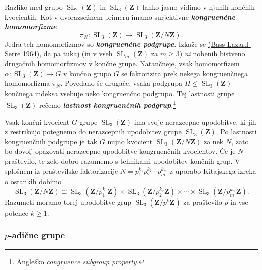 \documentclass[11pt]{book}
\def\ZZ{\mathbf{Z}}
\DeclareMathOperator\SL{SL}
\def\definicija{\color{rdeca}\bf\em}
\theoremstyle{definition}
\theoremstyle{zgled}
\theoremstyle{odprtproblem}
\theoremstyle{domacanaloga}
\theoremstyle{izrek}
\begin{document}
Razliko med grupo $\SL_2(\ZZ)$ in $\SL_3(\ZZ)$ lahko jasno vidimo v njunih končnih kvocientih. Kot v dvorazsežnem primeru imamo surjektivne {\definicija kongruenčne homomorfizme}
\[
    \textstyle \pi_N \colon \SL_3(\ZZ) \to \SL_3(\ZZ/N\ZZ).
\]
Jedra teh homomorfizmov so {\definicija kongruenčne podgrupe}. Izkaže se \href{https://projecteuclid.org/journals/bulletin-of-the-american-mathematical-society-new-series/volume-70/issue-3/Sous-groupes-dindice-fini-dans-SLleft-nZ-right/bams/1183526018.full}{(Bass-Lazard-Serre 1964)}, da pa tukaj (in v vseh $\SL_m(\ZZ)$ za $m \geq 3$) \emph{ni} nobenih bistveno drugačnih homomorfizmov v končne grupe. Natančneje, vsak homomorfizem $\alpha \colon \SL_3(\ZZ) \to G$ v končno grupo $G$ se faktorizira prek nekega kongruenčnega homomorfizma $\pi_N$. Povedano še drugače, vsaka podgrupa $H \leq \SL_3(\ZZ)$ končnega indeksa vsebuje neko kongruenčno podgrupo. Tej lastnosti grupe $\SL_3(\ZZ)$ rečemo {\definicija lastnost kongruenčnih podgrup}.\footnote{Angleško \emph{congruence subgroup property.}}

Vsak končni kvocient $G$ grupe $\SL_3(\ZZ)$ ima svoje nerazcepne upodobitve, ki jih z restrikcijo potegnemo do nerazcepnih upodobitev grupe $\SL_3(\ZZ)$. Po lastnosti kongruenčnih podgrupe je tak $G$ nujno kvocient $\SL_3(\ZZ/N\ZZ)$ za nek $N$, zato bo dovolj opazovati nerazcepne upodobitve kongruenčnih kvocientov. Če je $N$ praštevilo, te zelo dobro razumemo s tehnikami upodobitev končnih grup. V splošnem iz praštevilske faktorizacije $N = p_1^{k_1} p_2^{k_2} \cdots p_m^{k_m}$ z uporabo Kitajskega izreka o ostankih dobimo
\[
    \textstyle \SL_3(\ZZ/N\ZZ) \cong \SL_3(\ZZ/p_1^{k_1}\ZZ) \times \SL_3(\ZZ/p_2^{k_2}\ZZ) \times \cdots \times \SL_3(\ZZ/p_m^{k_m}\ZZ).
\]
Razumeti moramo torej upodobitve grup $\SL_3(\ZZ/p^k\ZZ)$ za praštevilo $p$ in vse potence $k \geq 1$. 

\subsubsection{$p$-adične grupe}
\end{document}
